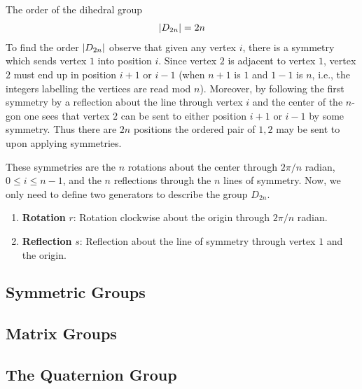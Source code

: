 {The order of the dihedral group
\begin{align*}
    \left\vert D_{2n} \right\vert = 2n
\end{align*}
}
{To find the order $\left\vert D_{2n} \right\vert$ observe that given any vertex $i$,
there is a symmetry which sends vertex $1$ into position $i$.
Since vertex $2$ is adjacent to vertex $1$, vertex $2$ must end up in position $i+1$ or $i-1$
(when $n+1$ is $1$ and $1-1$ is $n$, i.e., the integers labelling the vertices are read mod $n$).
Moreover, by following the first symmetry by a reflection about the line through vertex $i$ and the center
of the $n$-gon one sees that vertex $2$ can be sent to either position $i+1$ or $i-1$ by some symmetry.
Thus there are $2n$ positions the ordered pair of $1,2$ may be sent to upon applying symmetries.}
\begin{center}
    
\end{center}
\newpage
\thispagestyle{oddpagestyle}
These symmetries are the $n$ rotations about the center through $2\pi/n$ radian,
$0\le i\le n-1$, and the $n$ reflections through the $n$ lines of symmetry.
Now, we only need to define two generators to describe the group $D_{2n}$.
\begin{enumerate}[leftmargin=20pt, itemsep=0pt, topsep=3pt]
    \item {\bf Rotation} $r$: Rotation clockwise about the origin through $2\pi/n$ radian.
    \item {\bf Reflection} $s$: Reflection about the line of symmetry through vertex $1$ and the origin.
\end{enumerate}






\subsection{Symmetric Groups}








\subsection{Matrix Groups}









\subsection{The Quaternion Group}









